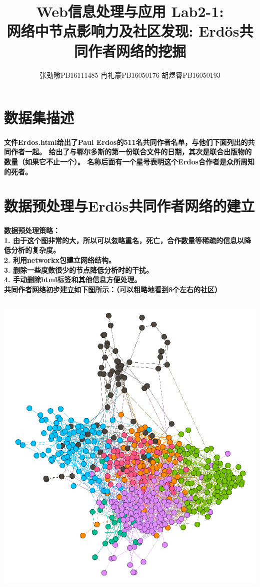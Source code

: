 \documentclass{ctexart}
\title{
    \LARGE
    Web信息处理与应用 Lab2-1: \\
    网络中节点影响力及社区发现: Erdös共同作者网络的挖掘
}
\author{
    张劲暾\quad PB16111485 \qquad
    冉礼豪\quad PB16050176 \qquad
    胡煜霄\quad PB16050193 
}
\begin{document}
    \maketitle
    \tableofcontents
    \section{数据集描述}
    \paragraph{
        文件Erdos.html给出了Paul Erdos的511名共同作者名单，与他们下面列出的共同作者一起。
        给出了与鄂尔多斯的第一份联合文件的日期，其次是联合出版物的数量（如果它不止一个）。 名称后面有一个星号表明这个Erdos合作者是众所周知的死者。
    }
    \section{数据预处理与Erdös共同作者网络的建立}
    \paragraph{
        数据预处理策略：\\
        1. 由于这个图非常的大，所以可以忽略重名，死亡，合作数量等稀疏的信息以降低分析的复杂度。\\
        2. 利用networkx包建立网络结构。 \\
        3. 删除一些度数很少的节点降低分析时的干扰。\\
        4. 手动删除html标签和其他信息方便处理。\\
        共同作者网络初步建立如下图所示：（可以粗略地看到8个左右的社区）
    }
    \begin{center}
        \includegraphics[height= 15cm] {b7.png}
    \end{center}
\end{document}
